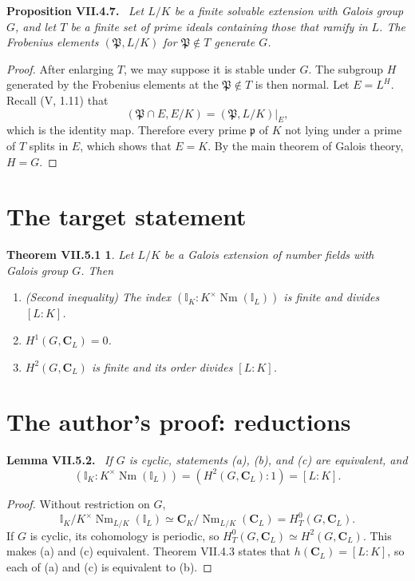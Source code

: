 \documentclass[11pt]{article}
\newcommand{\I}{\mathbb I}
\newcommand{\C}{\mathbf C}
\newcommand{\Nm}{\operatorname{Nm}}
\newcommand{\HT}[2]{H_T^{#1}(#2)}
\newtheorem*{target}{Theorem VII.5.1}
\newenvironment{authorresult}[2]{\par\medskip\noindent\textbf{#1 VII.#2.}\ \itshape}{\par\medskip}
\begin{document}
\begin{authorresult}{Proposition}{4.7}
Let $L/K$ be a finite solvable extension with Galois group $G$, and let $T$
be a finite set of prime ideals containing those that ramify in $L$.
The Frobenius elements $(\mathfrak P,L/K)$ for $\mathfrak P\notin T$
generate $G$.
\end{authorresult}
\begin{proof}
After enlarging $T$, we may suppose it is stable under $G$. The subgroup
$H$ generated by the Frobenius elements at the $\mathfrak P\notin T$ is then
normal. Let $E=L^H$. Recall (V, 1.11) that
\[
 (\mathfrak P\cap E,E/K)=(\mathfrak P,L/K)|_E,
\]
which is the identity map. Therefore every prime $\mathfrak p$ of $K$ not
lying under a prime of $T$ splits in $E$, which shows that $E=K$.
By the main theorem of Galois theory, $H=G$.
\end{proof}

\section*{The target statement}
\begin{target}
Let $L/K$ be a Galois extension of number fields with Galois group $G$. Then
\begin{enumerate}
\item[(a)] \emph{(Second inequality)} The index
$(\I_K:K^\times\Nm(\I_L))$ is finite and divides $[L:K]$.
\item[(b)] $H^1(G,\C_L)=0$.
\item[(c)] $H^2(G,\C_L)$ is finite and its order divides $[L:K]$.
\end{enumerate}
\end{target}

\section*{The author's proof: reductions}
\begin{authorresult}{Lemma}{5.2}
If $G$ is cyclic, statements (a), (b), and (c) are equivalent, and
\[
 (\I_K:K^\times\Nm(\I_L))=(H^2(G,\C_L):1)=[L:K].
\]
\end{authorresult}
\begin{proof}
Without restriction on $G$,
\[
 \I_K/K^\times\Nm_{L/K}(\I_L)
 \simeq\C_K/\Nm_{L/K}(\C_L)=\HT0{G,\C_L}.
\]
If $G$ is cyclic, its cohomology is periodic, so
$\HT0{G,\C_L}\simeq H^2(G,\C_L)$. This makes (a) and (c) equivalent.
Theorem VII.4.3 states that $h(\C_L)=[L:K]$, so each of (a) and (c) is
equivalent to (b).
\end{proof}
\end{document}
